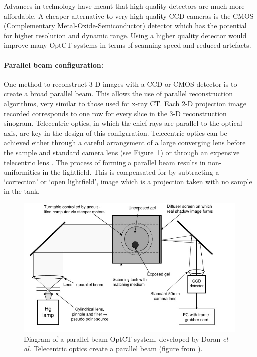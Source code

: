 \documentclass[12pt]{article}
\begin{document}

Advances in technology have meant that  high quality detectors are much more affordable. A cheaper alternative to very high quality CCD cameras is the CMOS (Complementary Metal-Oxide-Semiconductor) detector which has the potential for higher resolution and dynamic range. \cite{Doran:2008kh} Using a higher quality detector would improve many OptCT systems  in terms of scanning speed and reduced artefacts. \cite{Tarte:2007, Doran:2001ee}


\paragraph{Parallel beam configuration:} One method to reconstruct 3-D images with a CCD or CMOS detector is to create a broad parallel beam. This allows the use of parallel reconstruction algorithms, very similar to those used for x-ray CT. Each 2-D projection image recorded corresponds to one row for every slice in the 3-D reconstruction sinogram. \cite{Doran:2008kh}
Telecentric optics, in which the chief rays are parallel to the optical axis, are key in the design of this configuration. \cite{Walls:2005ja} Telecentric optics can be achieved either through a careful arrangement  of  a large converging lens before the sample and standard camera lens  \cite{Doran:2001ee} (see Figure~\ref{fig:doran_ccd_setup}) or through an expensive telecentric lens \cite{Sakhalkar:2008exa}. The process of forming a parallel beam results in non-uniformities in the lightfield. This is compensated for by subtracting a `correction' or `open lightfield', image which is a projection taken with no sample in the tank. \cite{Doran:2001ee}


\begin{figure}[H]
\centering
\includegraphics[scale=0.6]{Doran_2001_ccdsetup.jpg}
\caption{Diagram of a parallel beam  OptCT system, developed by Doran \textit{et al.} Telecentric optics create a parallel beam  (figure from \cite{Doran:2001ee}). }
\label{fig:doran_ccd_setup}
\end{figure}
\end{document}
